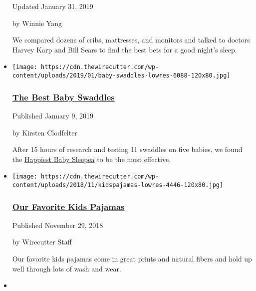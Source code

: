 \begin{itemize}
  Updated January 31, 2019

  by Winnie Yang

  We compared dozens of cribs, mattresses, and monitors and talked to
  doctors Harvey Karp and Bill Sears to find the best bets for a good
  night's sleep.
\item
  \href{https://www.nytimes3xbfgragh.onion/wirecutter/reviews/best-baby-swaddles/}{}

  \texttt{[image: https://cdn.thewirecutter.com/wp-content/uploads/2019/01/baby-swaddles-lowres-6088-120x80.jpg]}

  \hypertarget{the-best-baby-swaddles}{%
  \subsubsection{\texorpdfstring{\href{https://www.nytimes3xbfgragh.onion/wirecutter/reviews/best-baby-swaddles/}{The
  Best Baby
  Swaddles}}{The Best Baby Swaddles}}\label{the-best-baby-swaddles}}

  Published January 9, 2019

  by Kirsten Clodfelter

  After 15 hours of research and testing 11 swaddles on five babies, we
  found the
  \href{https://www.nytimes3xbfgragh.onion/wirecutter/out/link/30686/162165/4/86635/?merchant=BuyBuy\%20Baby}{Happiest
  Baby Sleepea} to be the most effective.
\item
  \href{https://www.nytimes3xbfgragh.onion/wirecutter/reviews/our-favorite-kids-pajamas/}{}

  \texttt{[image: https://cdn.thewirecutter.com/wp-content/uploads/2018/11/kidspajamas-lowres-4446-120x80.jpg]}

  \hypertarget{our-favorite-kids-pajamas}{%
  \subsubsection{\texorpdfstring{\href{https://www.nytimes3xbfgragh.onion/wirecutter/reviews/our-favorite-kids-pajamas/}{Our
  Favorite Kids
  Pajamas}}{Our Favorite Kids Pajamas}}\label{our-favorite-kids-pajamas}}

  Published November 29, 2018

  by Wirecutter Staff

  Our favorite kids pajamas come in great prints and natural fibers and
  hold up well through lots of wash and wear.
\item
  \href{https://www.nytimes3xbfgragh.onion/wirecutter/reviews/best-double-strollers/}{}


\end{itemize}
